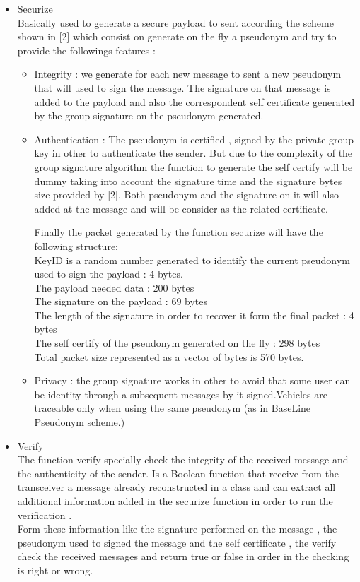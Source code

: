 \begin{itemize}

\item Securize\\
Basically used to generate a secure payload to sent according the scheme shown in [2] which consist on generate on the fly a pseudonym and try to provide the followings features :
\begin{itemize}
\item Integrity : we generate for each new message  to sent a new pseudonym that will used to sign the message. The signature on that message is added to the payload and also the correspondent self certificate generated by the group signature on the pseudonym generated. 
\item Authentication : The pseudonym  is  certified , signed by the private group key in other to authenticate the sender. But due to the complexity of the group signature algorithm the function to generate the self certify will be dummy taking into account the signature time and the signature bytes size provided by [2]. Both pseudonym  and the signature on it will also added at the message and will be consider as the related certificate.

Finally the packet generated by the function securize will have the following structure:\\
    KeyID is a random number generated to identify the current pseudonym used to sign the payload : 4 bytes.\\
    The payload needed data : 200 bytes \\
    The signature on the payload : 69 bytes\\
    The length of the signature in order to recover it form the final packet : 4 bytes\\
    The self certify of the pseudonym generated on the fly : 298 bytes\\
  Total packet size represented as a vector of bytes is 570 bytes.\\
\item Privacy : the group signature works in other to avoid that some user can be identity through a subsequent messages by it signed.Vehicles are traceable only when using the same pseudonym (as in BaseLine Pseudonym scheme.) 
\end{itemize}

\item Verify\\
The function verify specially check the integrity of the received message and the authenticity of the sender.
Is a Boolean function that receive from the transceiver a message already reconstructed in a class and can extract all additional  information added in the securize  function in order to run the verification .\\
Form these information like the signature performed on the message , the pseudonym  used to signed the message and the self certificate , the verify check  the received messages and return true or false in order in the checking is right or wrong.
\end{itemize}


